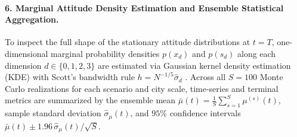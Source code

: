 \paragraph{6. Marginal Attitude Density Estimation and Ensemble Statistical Aggregation.}
To inspect the full shape of the stationary attitude distributions at $t = T$, one-dimensional marginal probability densities $p(x_d)$ and $p(s_d)$ along each dimension $d \in \{0, 1, 2, 3\}$ are estimated via Gaussian kernel density estimation (KDE) with Scott's bandwidth rule $h = N^{-1/5}\hat{\sigma}_d$ \citep{scott2015multivariate}. Across all $S = 100$ Monte Carlo realizations for each scenario and city scale, time-series and terminal metrics are summarized by the ensemble mean $\bar{\mu}(t) = \frac{1}{S}\sum_{s=1}^S \mu^{(s)}(t)$, sample standard deviation $\hat{\sigma}_{\mu}(t)$, and $95\%$ confidence intervals $\bar{\mu}(t) \pm 1.96\,\hat{\sigma}_{\mu}(t)/\sqrt{S}$.
